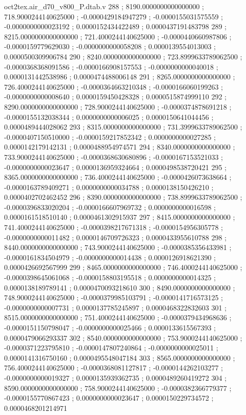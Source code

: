\begin{filecontents}[overwrite]{oct2tex.air_d70_v800_P.dtab.v}
288 ; 8190.0000000000000000 ; 718.9000244140625000 ; -0.0000429184947279 ; -0.0000155031575559 ; -0.0000000000023192 ; 0.0000152434422489 ; 0.0000437191483798
289 ; 8215.0000000000000000 ; 721.4000244140625000 ; -0.0000440660987806 ; -0.0000159779629030 ; -0.0000000000058208 ; 0.0000139554013003 ; 0.0000500309906784
290 ; 8240.0000000000000000 ; 723.8999633789062500 ; -0.0000368368091586 ; -0.0000166908157553 ; -0.0000000000040018 ; 0.0000131442538986 ; 0.0000474488006148
291 ; 8265.0000000000000000 ; 726.4000244140625000 ; -0.0000364663210348 ; -0.0000166060199263 ; -0.0000000000008640 ; 0.0000159450428328 ; 0.0000515874999110
292 ; 8290.0000000000000000 ; 728.9000244140625000 ; -0.0000374878691218 ; -0.0000155132038344 ; 0.0000000000006025 ; 0.0000150641044456 ; 0.0000489444028062
293 ; 8315.0000000000000000 ; 731.3999633789062500 ; -0.0000407150510000 ; -0.0000159217852342 ; 0.0000000000027285 ; 0.0000142179142131 ; 0.0000488954974571
294 ; 8340.0000000000000000 ; 733.9000244140625000 ; -0.0000368630680896 ; -0.0000167153521033 ; -0.0000000000023647 ; 0.0000136959324664 ; 0.0000498538720421
295 ; 8365.0000000000000000 ; 736.4000244140625000 ; -0.0000426073638664 ; -0.0000163789409271 ; 0.0000000000034788 ; 0.0000138150426210 ; 0.0000402702462452
296 ; 8390.0000000000000000 ; 738.8999633789062500 ; -0.0000396833020204 ; -0.0000166607969732 ; 0.0000000000016598 ; 0.0000161518510140 ; 0.0000461302915937
297 ; 8415.0000000000000000 ; 741.4000244140625000 ; -0.0000398217671318 ; -0.0000154956305778 ; -0.0000000000011482 ; 0.0000146709726323 ; 0.0000433955610788
298 ; 8440.0000000000000000 ; 743.9000244140625000 ; -0.0000385356433981 ; -0.0000161834504979 ; -0.0000000000014438 ; 0.0000126918621390 ; 0.0000426692567999
299 ; 8465.0000000000000000 ; 746.4000244140625000 ; -0.0000398645061068 ; -0.0000158803195518 ; 0.0000000000014325 ; 0.0000138189789141 ; 0.0000470093218610
300 ; 8490.0000000000000000 ; 748.9000244140625000 ; -0.0000379985103791 ; -0.0000141716573125 ; -0.0000000000007731 ; 0.0000137785245897 ; 0.0000468322832603
301 ; 8515.0000000000000000 ; 751.4000244140625000 ; -0.0000379434968636 ; -0.0000151150798047 ; -0.0000000000025466 ; 0.0000133615567393 ; 0.0000479066293337
302 ; 8540.0000000000000000 ; 753.9000244140625000 ; -0.0000371223795810 ; -0.0000147807240864 ; -0.0000000000025011 ; 0.0000141316750160 ; 0.0000495548047184
303 ; 8565.0000000000000000 ; 756.4000244140625000 ; -0.0000368081127817 ; -0.0000144262103277 ; -0.0000000000019327 ; 0.0000135939362735 ; 0.0000489260419272
304 ; 8590.0000000000000000 ; 758.9000244140625000 ; -0.0000382366779377 ; -0.0000155770867423 ; 0.0000000000023647 ; 0.0000150229734572 ; 0.0000468201214971

\end{filecontents}
